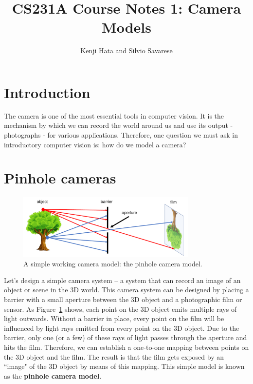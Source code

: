 \documentclass[a4paper, 12pt]{article}
\title{CS231A Course Notes 1: Camera Models}
\author{Kenji Hata and Silvio Savarese}
\date{}
\renewcommand\emph{\textbf}
\begin{document}
\maketitle

\section{Introduction}
The camera is one of the most essential tools in computer vision. It is the mechanism by which we can record the world around us and use its output - photographs - for various applications. Therefore, one question we must ask in introductory computer vision is: how do we model a camera?

\section{Pinhole cameras}
\begin{figure}[h!]
\centering
\includegraphics[width=0.8\textwidth]{figures/1-1.pdf}
\caption{A simple working camera model: the pinhole camera model.}
\label{fig:simpleCamera}
\end{figure}
Let's design a simple camera system -- a system that can record an image of an object or scene in the 3D world. This camera system can be designed by placing a barrier with a small aperture between the 3D object and a photographic film or sensor. As Figure~\ref{fig:simpleCamera} shows, each point on the 3D object emits multiple rays of light outwards. Without a barrier in place, every point on the film will be influenced by light rays emitted from every point on the 3D object. Due to the barrier, only one (or a few) of these rays of light passes through the aperture and hits the film. Therefore, we can establish a one-to-one mapping between points on the 3D object and the film. The result is that the film gets exposed by an ``image" of the 3D object by means of this mapping. This simple model is known as the \emph{pinhole camera model}.
\end{document}
